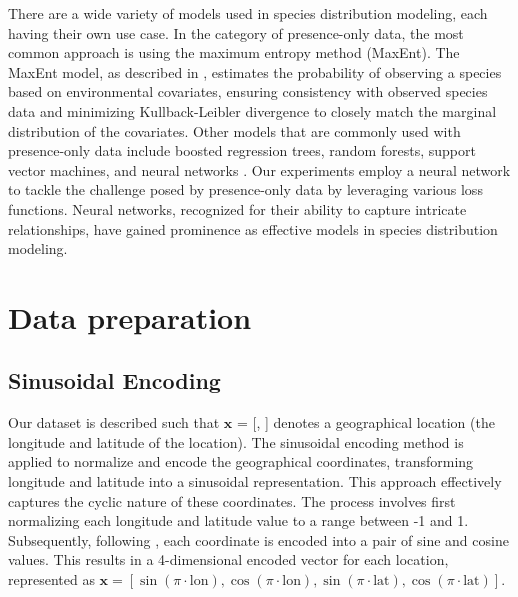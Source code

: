 \documentclass{article}
\begin{document}
There are a wide variety of models used in species distribution modeling, each having their own use case. In the category of presence-only data, the most common approach is using the maximum entropy method (MaxEnt). The MaxEnt model, as described in \cite{review, maxent, rareplants}, estimates the probability of observing a species based on environmental covariates, ensuring consistency with observed species data and minimizing Kullback-Leibler divergence to closely match the marginal distribution of the covariates. Other models that are commonly used with presence-only data include boosted regression trees, random forests, support vector machines, and neural networks \cite{multi-speciesembedding, review, cnnenvironmentcooccurrences}. Our experiments employ a neural network to tackle the challenge posed by presence-only data by leveraging various loss functions. Neural networks, recognized for their ability to capture intricate relationships, have gained prominence as effective models in species distribution modeling.

\section{Data preparation}

\subsection{Sinusoidal Encoding}

Our dataset is described such that $\mathbf{x}$ = [, ] denotes a geographical location (the longitude and latitude of the location). The sinusoidal encoding method is applied to normalize and encode the geographical coordinates, transforming longitude and latitude into a sinusoidal representation. This approach effectively captures the cyclic nature of these coordinates. The process involves first normalizing each longitude and latitude value to a range between -1 and 1. Subsequently, following \cite{spatial, colecomputervision}, each coordinate is encoded into a pair of sine and cosine values. This results in a 4-dimensional encoded vector for each location, represented as \( \mathbf{x} = \left[ \sin(\pi \cdot \text{lon}), \cos(\pi \cdot \text{lon}), \sin(\pi \cdot \text{lat}), \cos(\pi \cdot \text{lat}) \right] \).
\end{document}
